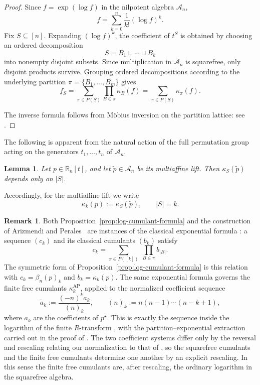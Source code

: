 \documentclass[11pt]{amsart}
\newtheorem{lem}[thm]{Lemma}
\theoremstyle{definition}
\newtheorem{remark}[thm]{Remark}
\newcommand{\R}{\mathbb{R}}
\begin{document}
\begin{proof}
Since $f=\exp(\log f)$ in the nilpotent algebra
$\mathcal{A}_n$,
\[
  f
  =
  \sum_{k=0}^n \frac{1}{k!}(\log f)^k.
\]
Fix $S\subseteq[n]$.  Expanding $(\log f)^k$, the coefficient
of $t^S$ is obtained by choosing an ordered decomposition
\[
  S=B_1\sqcup\cdots\sqcup B_k
\]
into nonempty disjoint subsets.  Since multiplication in $\mathcal{A}_n$ is squarefree, only disjoint products survive.
Grouping ordered decompositions according to the underlying
partition $\pi=\{B_1,\dots,B_m\}$ gives
\[
  f_S
  =
  \sum_{\pi\in P(S)}
  \prod_{B\in\pi}\kappa_B(f)
  =
  \sum_{\pi\in P(S)}
  \kappa_\pi(f).
\]

The inverse formula follows from M\"obius inversion on the
partition lattice: see \cite[Section 3.10]{Sta12}.
\end{proof}

The following is apparent from the natural action of the full permutation group acting on the generators $t_1,\dotsc,t_n$ of $\mathcal A_n$.

\begin{lem}\label{lem:symmetric-cumulants}
Let $p\in\R_n[t]$, and let $\widetilde p\in\mathcal{A}_n$ be its multiaffine lift.  Then $\kappa_S(\widetilde p)$ depends only on $|S|$.
\end{lem}

Accordingly, for the multiaffine lift we write
\[
  \kappa_k(p):=\kappa_S(\widetilde p),
  \qquad |S|=k.
\]

\begin{remark}\label{rem:AP-comparison}
Both Proposition~\ref{prop:log-cumulant-formula} and the construction of Arizmendi and Perales~\cite{AP18} are instances of the classical exponential formula \cite[equation (2.7)]{AP18}: a sequence $(c_k)$ and its classical cumulants $(b_k)$ satisfy
\[
  c_k=\sum_{\pi\in P([k])}\ \prod_{B\in\pi} b_{|B|}.
\]
The symmetric form of Proposition~\ref{prop:log-cumulant-formula} is this relation with $c_k=\beta_n(p)_k$ and $b_k=\kappa_k(p)$. The same exponential formula governs the finite free cumulants $\kappa^{\mathrm{AP}}_k$, applied to the normalized coefficient sequence
\[
  \widetilde a_k:=\frac{(-n)^{k}a_k}{(n)_k},
  \qquad (n)_k:=n(n-1)\dotsb(n-k+1),
\]
where $a_k$ are the coefficients of $p^\star$. This is exactly the sequence inside the logarithm of the finite $R$-transform \cite[equation (3.1)]{AP18}, with the partition--exponential extraction carried out in the proof of \cite[Proposition 3.4]{AP18}. The two coefficient systems differ only by the reversal and rescaling relating our normalization to that of \cite{AP18, MSS22}, so the squarefree cumulants and the finite free cumulants determine one another by an explicit rescaling. In this sense the finite free cumulants are, after rescaling, the ordinary logarithm in the squarefree algebra.
\end{remark}
\end{document}
